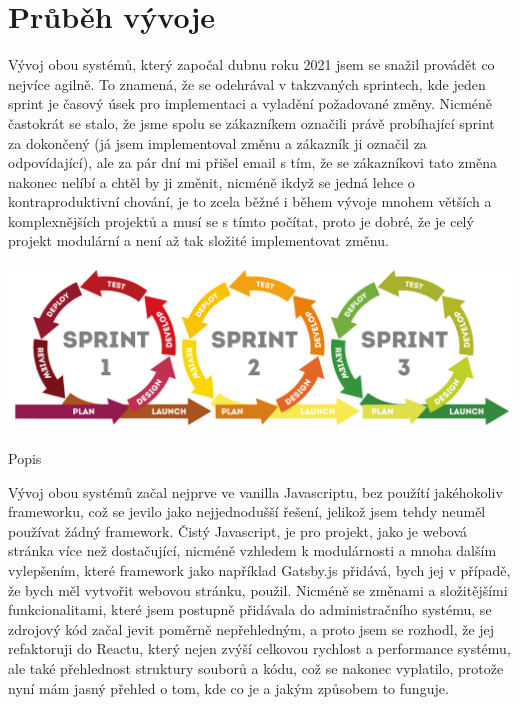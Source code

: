 \documentclass[12pt,a4paper]{report}
\begin{document}
  \chapter{Průběh vývoje}
  Vývoj obou systémů, který započal dubnu roku 2021 jsem se snažil provádět co nejvíce agilně. To znamená,
  že se odehrával v takzvaných sprintech, kde jeden sprint je časový úsek pro implementaci a vyladění požadované změny.
  Nicméně častokrát se stalo, že jsme spolu se zákazníkem označili právě probíhající sprint za dokončený (já jsem implementoval změnu a zákazník ji označil za odpovídající), ale za pár dní mi 
  přišel email s tím, že se zákazníkovi tato změna nakonec nelíbí a chtěl by ji změnit, nicméně ikdyž se jedná lehce o kontraproduktivní chování, 
  je to zcela běžné i během vývoje mnohem větších a komplexnějších projektů a musí se s tímto počítat, proto je dobré, že je celý projekt modulární a není až tak složité implementovat změnu.
  
  \vspace*{0.5cm}
  \noindent\includegraphics[width=\linewidth]{agile.png}
  \begin{center}
    Popis
  \end{center}
  \vspace*{0.5cm}
 
  Vývoj obou systémů začal nejprve ve vanilla Javascriptu, bez použítí jakéhokoliv frameworku, což
  se jevilo jako nejjednodušší řešení, jelikož jsem tehdy neuměl používat žádný framework. Čistý Javascript, je pro projekt, jako je webová stránka více než
  dostačující, nicméně vzhledem k modulárnosti a mnoha dalším vylepšením, které framework jako například Gatsby.js přidává, bych jej v případě, že bych měl vytvořit webovou stránku, použil.
  Nicméně se změnami a složitějšími funkcionalitami, které jsem postupně přidávala do administračního systému, se zdrojový kód začal jevit
  poměrně nepřehledným, a proto jsem se rozhodl, že jej refaktoruji do Reactu, který nejen zvýší celkovou rychlost a performance systému, ale také přehlednost struktury souborů a kódu,
  což se nakonec vyplatilo, protože nyní mám jasný přehled o tom, kde co je a jakým způsobem to funguje.
\end{document}

